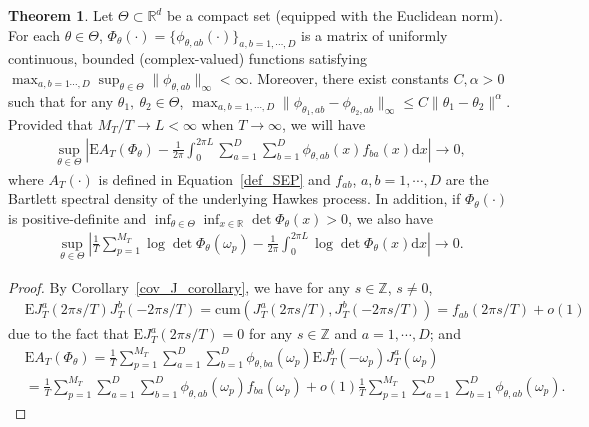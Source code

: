 \documentclass[11pt]{article}
\numberwithin{equation}{section}
\theoremstyle{plain}
\theoremstyle{definition}
\theoremstyle{definition}
\theoremstyle{assumption}
\theoremstyle{proposition}
\theoremstyle{proposition}
\theoremstyle{example}
\theoremstyle{lemma}
\theoremstyle{theorem}
\newtheorem{theorem}{Theorem}[section]
\theoremstyle{remark}
\begin{document}
\begin{theorem}\label{deterministic_conv_thm}
Let $\Theta\subset \mathbb{R}^d$ be a compact set (equipped with the Euclidean norm). For each $\theta\in\Theta$, $\Phi_{\theta}(\cdot)=\{\phi_{\theta, ab}(\cdot)\}_{a,b=1,\cdots,D}$ is a matrix of uniformly continuous, bounded (complex-valued) functions satisfying $\max_{a,b=1\cdots,D}\sup_{\theta\in\Theta}\|\phi_{\theta, ab}\|_{\infty}< \infty$. Moreover, there exist constants $C,\alpha>0$ such that for any $\theta_1,~\theta_2\in\Theta$, $\max_{a,b=1,\cdots,D}\|\phi_{\theta_1, ab} - \phi_{\theta_2, ab}\|_{\infty} \leqslant C\|\theta_1 - \theta_2\|^{\alpha}$. Provided that $M_T/T \rightarrow L < \infty$ when $T\rightarrow\infty$, we will have
\begin{align}\label{E_weighted_periodogram_conv_eqn}
\sup_{\theta\in\Theta}\left|\mathrm{E}A_T(\Phi_{\theta}) - \frac{1}{2\pi}\int_0^{2\pi L}\sum_{a=1}^D\sum_{b=1}^D\phi_{\theta, ab}(x)f_{ba}(x)\mathrm{d}x \right|\rightarrow 0,
\end{align}
where $A_T(\cdot)$ is defined in Equation~\ref{def_SEP} and $f_{ab}$, $a,b=1,\cdots,D$ are the Bartlett spectral density of the underlying Hawkes process. In addition, if $\Phi_{\theta}(\cdot)$ is positive-definite and $\inf_{\theta\in\Theta}\inf_{x\in\mathbb{R}}\det\Phi_{\theta}(x)>0$, we also have
\begin{align}\label{log_phi_conv_eqn}
\sup_{\theta\in\Theta}\left|\frac{1}{T}\sum_{p=1}^{M_T}\log\det\Phi_{\theta}(\omega_p)
- \frac{1}{2\pi}\int_0^{2\pi L}\log\det\Phi_{\theta}(x)\mathrm{d}x \right|\rightarrow 0 .
\end{align}
\begin{proof}
By Corollary~\ref{cov_J_corollary}, we have for any $s\in\mathbb{Z}$, $s\neq 0$,
\begin{align*}
&\mathrm{E}J_T^{a}(2\pi s/T)J_T^{b}(-2\pi s/T)=\mathrm{cum}(J_T^{a}(2\pi s/T), J_T^{b}(-2\pi s/T)) 
=f_{ab}(2\pi s/T) + o(1)
\end{align*}
due to the fact that $\mathrm{E}J_T^{a}(2\pi s/T)=0$ for any $s\in\mathbb{Z}$ and $a=1,\cdots,D$; and
\begin{align*}
&\mathrm{E}A_T(\Phi_{\theta})
=\frac{1}{T}\sum_{p=1}^{M_T}\sum_{a=1}^D\sum_{b=1}^D\phi_{\theta, ba}(\omega_p)\mathrm{E}J_T^{b}(-\omega_p)J_T^{a}(\omega_p) \\
&=\frac{1}{T}\sum_{p=1}^{M_T}\sum_{a=1}^D\sum_{b=1}^D\phi_{\theta, ab}(\omega_p)f_{ba}(\omega_p)
+o(1)\frac{1}{T}\sum_{p=1}^{M_T}\sum_{a=1}^D\sum_{b=1}^D\phi_{\theta, ab}(\omega_p) .
\end{align*}

\end{proof}
\end{theorem}
\end{document}
